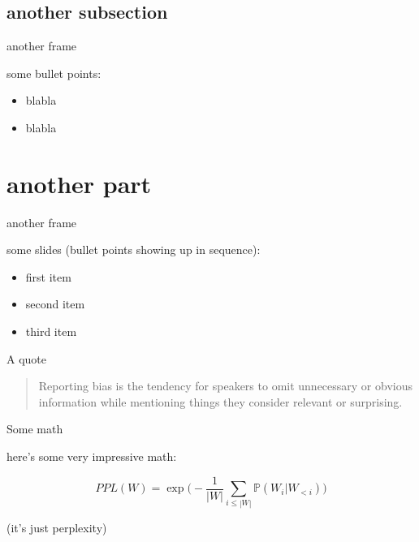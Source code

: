 \documentclass[notheorems, aspectratio=54, 14pt]{beamer}
\begin{document}
\subsection{another subsection}

\begin{frame}{another frame}

some bullet points:
\begin{itemize}
    \item blabla
    \item blabla
\end{itemize}
    
\end{frame}

\section{another part}

\begin{frame}{another frame}

    some slides (bullet points showing up in sequence):

\begin{itemize}[<+->]
    \item first item
    \item second item
    \item third item
\end{itemize}

    
\end{frame}

\begin{frame}{A quote}

\begin{parchment}
    \begin{quote}
        Reporting bias is the tendency for speakers to omit unnecessary or obvious information while mentioning things they consider relevant or surprising.
    \end{quote}
\end{parchment}
    
\end{frame}

\begin{frame}{Some math}

\begin{block}{here's some very impressive math:}
    
$$
  PPL(W) 
= \exp{\Bigg(-\frac{1}{|W|}\sum_{i \leq |W|}\mathbb{P}(W_i|W_{<i})\Bigg)}
$$ 
    
\end{block}

\footnotesize\vfill\hfill (it's just perplexity)
    
\end{frame}
\end{document}
